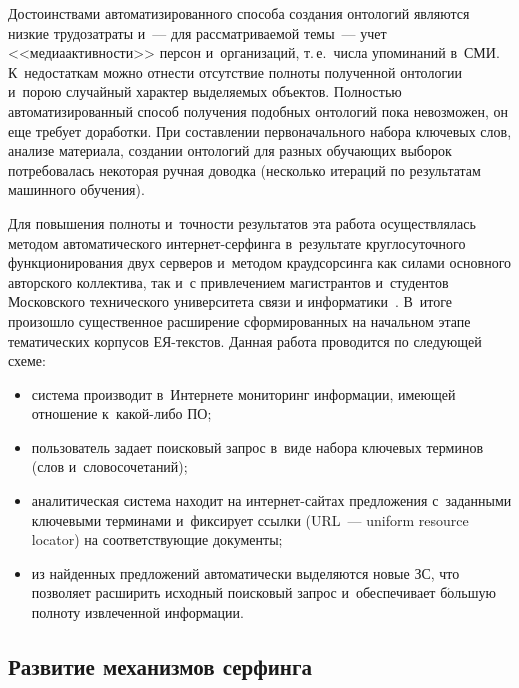 \begin{multicols}{2}
     Достоинствами автоматизированного способа создания онтологий
являются низкие трудозатраты и~--- для рассматриваемой темы~--- учет
<<медиаактивности>> персон и~организаций, т.\,е.\ числа упоминаний в~СМИ. К~недостаткам можно отнести отсутствие полноты полученной
онтологии и~порою случайный характер выделяемых объектов. Полностью
автоматизированный способ получения подобных онтологий пока
невозможен, он еще требует доработки. При составлении первоначального
набора ключевых слов, анализе материала, создании онтологий для разных
обучающих выборок потребовалась некоторая ручная доводка (несколько
итераций по результатам машинного обучения).

     Для повышения полноты и~точности результатов эта работа
осуществлялась методом автоматического ин\-тер\-нет-сер\-фин\-га в~результате круглосуточного функционирования двух серверов и~методом
краудсорсинга как силами основного авторского коллектива, так и~с
привлечением магистрантов и~студентов Московского технического университета связи и информатики~\cite{5-koz}. В~итоге
произошло существенное расширение сформированных на начальном этапе
тематических корпусов ЕЯ-текс\-тов. Данная работа проводится по
следующей схеме:
     \begin{itemize}
\item система производит в~Интернете мониторинг информации, имеющей
отношение к~ка\-кой-ли\-бо ПО;
\item пользователь задает поисковый запрос в~виде набора ключевых
терминов (слов и~словосочетаний);
\item аналитическая система находит на ин\-тер\-нет-сай\-тах предложения с~заданными ключевыми терминами и~фиксирует ссылки (URL~---
    uniform resource locator) на
соответствующие документы;
\item из найденных предложений автоматически выделяются новые ЗС, что
позволяет расширить исходный поисковый запрос и~обеспечивает б$\acute{\mbox{о}}$льшую
полноту извлеченной информации.
\end{itemize}

     \subsection{Развитие механизмов серфинга}


\end{multicols}
